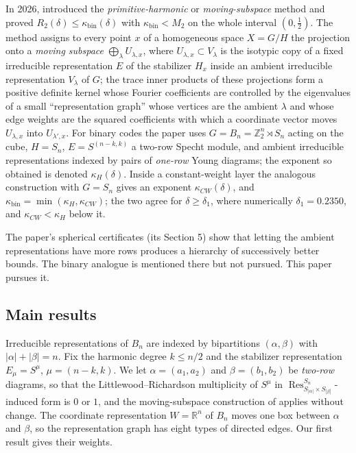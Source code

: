 \documentclass[11pt]{amsart}
\theoremstyle{definition}
\newcommand{\R}{\mathbb R}
\newcommand{\Z}{\mathbb Z}
\newcommand{\Res}{\operatorname{Res}}
\begin{document}
In 2026, \cite{OAI2026} introduced the \emph{primitive-harmonic} or \emph{moving-subspace} method and proved $R_2(\delta)\le\kappa_{\mathrm{bin}}(\delta)$ with $\kappa_{\mathrm{bin}}<M_2$ on the whole interval $(0,\tfrac12)$. The method assigns to every point $x$ of a homogeneous space $X=G/H$ the projection onto a \emph{moving subspace} $\bigoplus_\lambda U_{\lambda,x}$, where $U_{\lambda,x}\subset V_\lambda$ is the isotypic copy of a fixed irreducible representation $E$ of the stabilizer $H_x$ inside an ambient irreducible representation $V_\lambda$ of $G$; the trace inner products of these projections form a positive definite kernel whose Fourier coefficients are controlled by the eigenvalues of a small ``representation graph'' whose vertices are the ambient $\lambda$ and whose edge weights are the squared coefficients with which a coordinate vector moves $U_{\lambda,x}$ into $U_{\lambda',x}$. For binary codes the paper uses $G=B_n=\Z_2^n\rtimes S_n$ acting on the cube, $H=S_n$, $E=S^{(n-k,k)}$ a two-row Specht module, and ambient irreducible representations indexed by pairs of \emph{one-row} Young diagrams; the exponent so obtained is denoted $\kappa_H(\delta)$. Inside a constant-weight layer the analogous construction with $G=S_n$ gives an exponent $\kappa_{CW}(\delta)$, and $\kappa_{\mathrm{bin}}=\min(\kappa_H,\kappa_{CW})$; the two agree for $\delta\ge\delta_1$, where numerically $\delta_1=0.2350$, and $\kappa_{CW}<\kappa_H$ below it.

The paper's spherical certificates (its Section 5) show that letting the ambient representations have more rows produces a hierarchy of successively better bounds. The binary analogue is mentioned there but not pursued. This paper pursues it.

\subsection{Main results}

Irreducible representations of $B_n$ are indexed by bipartitions $(\alpha,\beta)$ with $|\alpha|+|\beta|=n$. Fix the harmonic degree $k\le n/2$ and the stabilizer representation $E_\mu=S^\mu$, $\mu=(n-k,k)$. We let $\alpha=(a_1,a_2)$ and $\beta=(b_1,b_2)$ be \emph{two-row} diagrams, so that the Littlewood--Richardson multiplicity of $S^\mu$ in $\Res^{S_n}_{S_{|\alpha|}\times S_{|\beta|}}$-induced form is $0$ or $1$, and the moving-subspace construction of \cite{OAI2026} applies without change. The coordinate representation $W=\R^n$ of $B_n$ moves one box between $\alpha$ and $\beta$, so the representation graph has eight types of directed edges. Our first result gives their weights.
\end{document}
